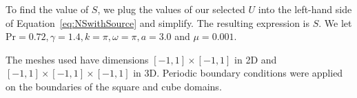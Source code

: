 To find the value of $S$, we plug the values of our selected $U$ into the left-hand side of Equation~\eqref{eq:NSwithSource} and simplify. The resulting expression is $S$. 
We let Pr$=0.72, \gamma = 1.4, k = \pi, \omega = \pi, a = 3.0$ and $\mu = 0.001$.

The meshes used have dimensions $[-1,1] \times [-1,1]$ in 2D and $[-1,1] \times [-1,1] \times [-1,1]$ in 3D. Periodic boundary conditions were applied on the boundaries of the square and cube domains.








%
%
%
